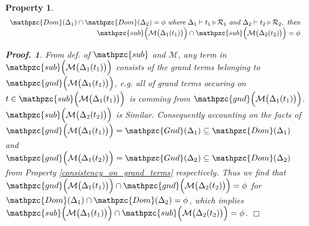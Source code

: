 \documentclass[12pt]{article}
\newtheorem{Property}{Property}[section]
\newtheorem{Proof}{Proof.}
\begin{document}
\begin{Property}
  \label{consistency_on_domain_independency}
  \[ \begin{array}{r}
       \mathpzc{Dom}(\Delta_1) \cap \mathpzc{Dom}(\Delta_2) = \phi\
        \text{\it where}\ \Delta_1 \vdash t_1 \triangleright \mathcal{R}_1\
         \text{\it and}\ \Delta_2 \vdash t_2 \triangleright \mathcal{R}_2,\
          \text{\it then}  \\
       \mathpzc{sub}\Bigl(\mathcal{M}\bigl(\Delta_1(t_1) \bigr) \Bigr) \cap
        \mathpzc{sub}\Bigl(\mathcal{M}\bigl(\Delta_2(t_2) \bigr) \Bigr) = \phi
     \end{array}
  \]
  \begin{Proof}
    From def. of $\mathpzc{sub}$ and $\mathcal{M}$, any term in
    $\mathpzc{sub}\Bigl(\mathcal{M}\bigl(\Delta_1(t_1) \bigr) \Bigr)$
    consists of the grand terms belonging to
    $\mathpzc{gnd}\Bigl(\mathcal{M}\bigl(\Delta_1(t_1) \bigr) \Bigr)$, e.g.
    all of grand terms occuring on
    $t \in \mathpzc{sub}\Bigl(\mathcal{M}\bigl(\Delta_1(t_1) \bigr) \Bigr)$
    is comming from
    $\mathpzc{gnd}\Bigl(\mathcal{M}\bigl(\Delta_1(t_1) \bigr) \Bigr)$.
    $\mathpzc{sub}\Bigl(\mathcal{M}\bigl(\Delta_2(t_2) \bigr) \Bigr)$ is
    Similar. Consequently accounting on the facts of
    $\mathpzc{gnd}\Bigl(\mathcal{M}\bigl(\Delta_1(t_1) \bigr) \Bigr) =
    \mathpzc{Gnd}(\Delta_1) \subseteq \mathpzc{Dom}(\Delta_1)$ and
    $\mathpzc{gnd}\Bigl(\mathcal{M}\bigl(\Delta_1(t_2) \bigr) \Bigr) =
    \mathpzc{Gnd}(\Delta_2) \subseteq \mathpzc{Dom}(\Delta_2)$ from
    Property \ref{consistency_on_grand_terms} respectively. Thus we find that
    $\mathpzc{gnd}\Bigl(\mathcal{M}\bigl(\Delta_1(t_1) \bigr) \Bigr) \cap
    \mathpzc{gnd}\Bigl(\mathcal{M}\bigl(\Delta_2(t_2) \bigr) \Bigr) = \phi$
    for $\mathpzc{Dom}(\Delta_1) \cap \mathpzc{Dom}(\Delta_2) = \phi$, which
    implies
    $\mathpzc{sub}\Bigl(\mathcal{M}\bigl(\Delta_1(t_1) \bigr) \Bigr) \cap
    \mathpzc{sub}\Bigl(\mathcal{M}\bigl(\Delta_2(t_2) \bigr) \Bigr) = \phi$.
    $\Box$
  \end{Proof}
\end{Property}
\end{document}
